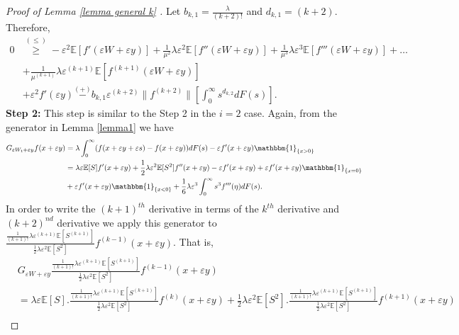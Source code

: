 \documentclass[11pt,letterpaper,reqno]{article}
\theoremstyle{thmstyleone}%
\theoremstyle{thmstyletwo}%
\theoremstyle{thmstylethree}%
\numberwithin{equation}{section}
\begin{document}
\begin{proof}[Proof of Lemma \ref{lemma general k} ]
Let $b_{k,1}=\frac{\lambda}{(k+2)!}$ and $d_{k,1}=(k+2)$. Therefore,
\begin{align} \label{stg11}
 \nonumber   0 &\stackrel{(\leq)}{\geq} -\varepsilon^2\mathbb E[f'(\varepsilon W+\varepsilon y)]+\frac{1}{\mu^2}\lambda \varepsilon^2 \mathbb E[f''(\varepsilon W+\varepsilon y)]+\frac{1}{\mu^3}\lambda \varepsilon^3 \mathbb E[f'''(\varepsilon W+\varepsilon y)]+ \ldots\\
 \nonumber    &+\frac{1}{\mu^{(k+1)}}\lambda \varepsilon^{(k+1)}\mathbb E[f^{(k+1)}(\varepsilon W+\varepsilon y)]\\
       &+\varepsilon^2 f'(\varepsilon y)\stackrel{(+)}{-}b_{k,1} \varepsilon^{(k+2)} \|f^{(k+2)}\| \left[\int_0^\infty s^{d_{k,2}} dF(s)\right].
\end{align}
\textbf{Step 2:} This step is similar to the Step 2 in the $i=2$ case. Again, from the generator in  Lemma \ref{lemma1} we have 
\begin{align*}
    G_{\varepsilon W_t+\varepsilon y}f(x+\varepsilon y)&=\lambda \int_0^\infty (f(x+\varepsilon y +\varepsilon s)-f(x+\varepsilon y))dF(s)-\varepsilon f'(x+\varepsilon y)\mathbbm{1}_{\{x>0\}}\\
  \nonumber   &=\lambda \varepsilon \mathbb E[S]f'(x+\varepsilon y)+\frac{1}{2}\lambda \varepsilon^2 \mathbb E[S^2]f''(x+\varepsilon y)-\varepsilon f'(x+\varepsilon y)+\varepsilon f'(x+\varepsilon y)\mathbbm{1}_{\{x=0\}}\\
  \nonumber   &+\varepsilon f'(x+\varepsilon y)\mathbbm{1}_{\{x<0\}} +\frac{1}{6}\lambda \varepsilon^3 \int_0^\infty s^3 f'''(\eta)dF(s).
\end{align*}
In order to write the $(k+1)^{th}$ derivative in terms of the $k^{th}$ derivative and $(k+2)^{nd}$ derivative  we apply this generator to $\frac{\frac{1}{(k+1)!}\lambda \varepsilon^{(k+1)} \mathbb E[S^{(k+1)}]}{\frac{1}{2}\lambda \varepsilon^2 \mathbb E[S^2]}f^{(k-1)}(x+\varepsilon y)$. That is,
\begin{align*}
  & G_{\varepsilon W+\varepsilon y}\frac{\frac{1}{(k+1)!}\lambda \varepsilon^{(k+1)} \mathbb E[S^{(k+1)}]}{\frac{1}{2}\lambda \varepsilon^2 \mathbb E[S^2]}f^{(k-1)}(x+\varepsilon y)\\
  &=\lambda \varepsilon \mathbb E[S].\frac{\frac{1}{(k+1)!}\lambda \varepsilon^{(k+1)} \mathbb E[S^{(k+1)}]}{\frac{1}{2}\lambda \varepsilon^2 \mathbb E[S^2]}f^{(k)}(x+\varepsilon y)+\frac{1}{2}\lambda \varepsilon^2 \mathbb E[S^2].\frac{\frac{1}{(k+1)!}\lambda \varepsilon^{(k+1)} \mathbb E[S^{(k+1)}]}{\frac{1}{2}\lambda \varepsilon^2 \mathbb E[S^2]}f^{(k+1)}(x+\varepsilon y)\\

\end{align*}
\end{proof}
\end{document}
